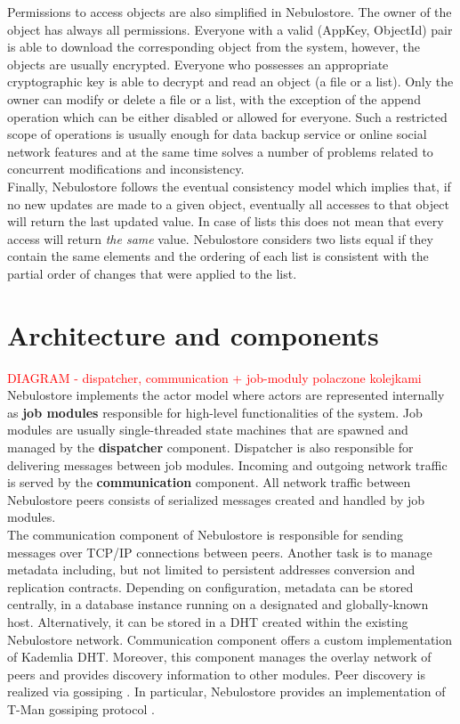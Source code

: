 \documentclass{pracamgren}
\begin{document}
Permissions to access objects are also simplified in Nebulostore. The owner of the object has always all permissions. Everyone with a valid (AppKey, ObjectId) pair is able to download the corresponding object from the system, however, the objects are usually encrypted. Everyone who possesses an appropriate cryptographic key is able to decrypt and read an object (a file or a list). Only the owner can modify or delete a file or a list, with the exception of the append operation which can be either disabled or allowed for everyone. Such a restricted scope of operations is usually enough for data backup service or online social network features and at the same time solves a number of problems related to concurrent modifications and inconsistency.\\

Finally, Nebulostore follows the eventual consistency model \cite{eventually} which implies that, if no new updates are made to a given object, eventually all accesses to that object will return the last updated value. In case of lists this does not mean that every access will return {\it the same} value. Nebulostore considers two lists equal if they contain the same elements and the ordering of each list is consistent with the partial order of changes that were applied to the list.\\

\section{Architecture and components}

\textcolor{red}{DIAGRAM - dispatcher, communication + job-moduly polaczone kolejkami}\\

Nebulostore implements the actor model where actors are represented internally as {\bf job modules} responsible for high-level functionalities of the system. Job modules are usually single-threaded state machines that are spawned and managed by the {\bf dispatcher} component. Dispatcher is also responsible for delivering messages between job modules. Incoming and outgoing network traffic is served by the {\bf communication} component. All network traffic between Nebulostore peers consists of serialized messages created and handled by job modules.\\

The communication component of Nebulostore is responsible for sending messages over TCP/IP connections between peers. Another task is to manage metadata including, but not limited to persistent addresses conversion and replication contracts. Depending on configuration, metadata can be stored centrally, in a database instance running on a designated and globally-known host. Alternatively, it can be stored in a DHT created within the existing Nebulostore network. Communication component offers a custom implementation of Kademlia \cite{kademlia} DHT. Moreover, this component manages the overlay network of peers and provides discovery information to other modules. Peer discovery is realized via gossiping \cite{gossiping}. In particular, Nebulostore provides an implementation of T-Man gossiping protocol \cite{tman}.\\
\end{document}
